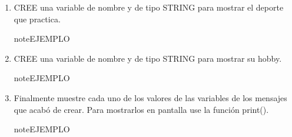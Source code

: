 \documentclass[letterpaper,10pt,spanish]{sphinxmanual}
\begin{document}
\begin{enumerate}
\item {} 
\sphinxAtStartPar
CREE una variable de nombre  y de tipo STRING para mostrar el deporte que practica.

\begin{sphinxadmonition}{note}{EJEMPLO}

\begin{sphinxVerbatim}[commandchars=\\\{\},numbers=left,firstnumber=1,stepnumber=1]
  
\end{sphinxVerbatim}
\end{sphinxadmonition}

\item {} 
\sphinxAtStartPar
CREE una variable de nombre  y de tipo STRING para mostrar su hobby.

\begin{sphinxadmonition}{note}{EJEMPLO}

\begin{sphinxVerbatim}[commandchars=\\\{\},numbers=left,firstnumber=1,stepnumber=1]
  
\end{sphinxVerbatim}
\end{sphinxadmonition}

\item {} 
\sphinxAtStartPar
Finalmente muestre cada uno de los valores de las variables de los mensajes que acabó de crear. Para mostrarlos en pantalla use la función print().

\begin{sphinxadmonition}{note}{EJEMPLO}


\end{sphinxadmonition}
\end{enumerate}
\end{document}
